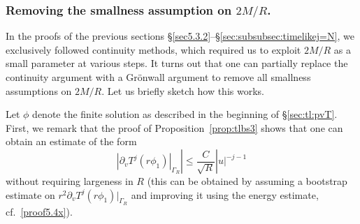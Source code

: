 \documentclass[11pt,english]{article}
\numberwithin{equation}{section}
\theoremstyle{remark}
\theoremstyle{plain}
\theoremstyle{remark}
\newcommand{\pv}{\partial_v}
\renewcommand{\(}{\left(}
\renewcommand{\)}{\right)}
\begin{document}
\subsubsection{Removing the smallness assumption on \texorpdfstring{$2M/R$}{2M/R}.}\label{sec:tl:removelargeness}
In the proofs of the previous sections \S\ref{sec5.3.2}--\S\ref{sec:subsubsec:timelikej=N}, we exclusively followed continuity methods, which required us to exploit $2M/R$ as a small parameter at various steps. 
It turns out that one can partially replace the continuity argument with a Gr\"onwall argument to remove all smallness assumptions on $2M/R$. 
Let us briefly sketch how this works. 

Let $\phi$ denote the finite solution as described in the beginning of \S\ref{sec:tl:pvT}.
First, we remark that the proof of Proposition~\ref{prop:tlbs3} shows that one can obtain an estimate of the form 
\begin{equation}\label{eq:tl:beyondN}
|\pv T^{j}(r\phi_1)|_{\Gamma_R}| \leq\frac{C}{\sqrt{R}}|u|^{-j-1}
\end{equation}
without requiring largeness in $R$ (this can be obtained by assuming a bootstrap estimate on $r^2\pv T^j(r\phi_1)|_{\Gamma_R}$ and improving it using the energy estimate, cf.\ \eqref{proof5.4x}). 
\end{document}
